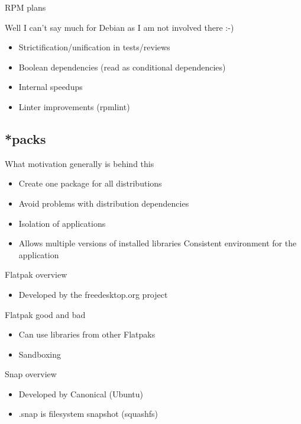 \documentclass{beamer}
\begin{document}
\begin{frame}[t]{RPM plans}
    \begin{center}Well I can't say much for Debian as I am not involved there :-)\end{center}
	\begin{itemize}
	\item Strictification/unification in tests/reviews
	\item Boolean dependencies (read as conditional dependencies)
	\item Internal speedups
	\item Linter improvements (rpmlint)
	\end{itemize}
\end{frame}

\subsection{*packs}

\begin{frame}[t]{What motivation generally is behind this}
	\begin{itemize}
	\item Create one package for all distributions
	\item Avoid problems with distribution dependencies
	\item Isolation of applications
	\item Allows multiple versions of installed libraries
	\itme Consistent environment for the application
	\end{itemize}
\end{frame}

\begin{frame}[t]{Flatpak overview}
	\begin{itemize}
	\item Developed by the freedesktop.org project
	\end{itemize}
\end{frame}

\begin{frame}[t]{Flatpak good and bad}
	\begin{itemize}
	\item Can use libraries from other Flatpaks
	\item Sandboxing
	\end{itemize}
\end{frame}

\begin{frame}[t]{Snap overview}
	\begin{itemize}
	\item Developed by Canonical (Ubuntu)
	\item .snap is filesystem snapshot (squashfs)
	\end{itemize}
\end{frame}
\end{document}
